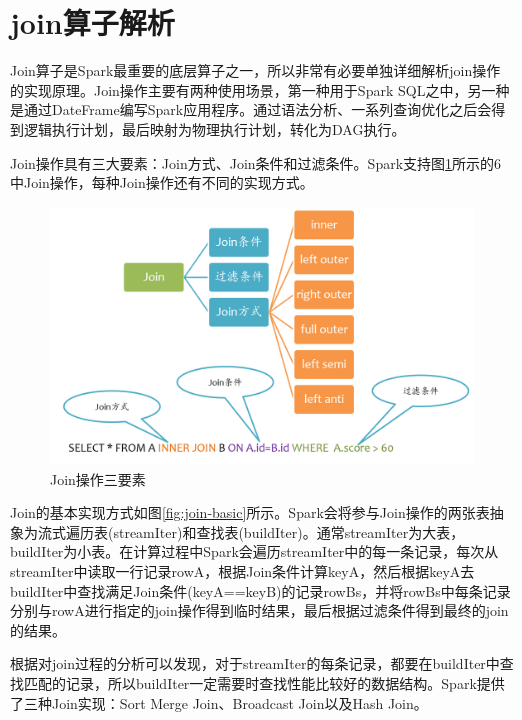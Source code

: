 \section{join算子解析}

Join算子是Spark最重要的底层算子之一，所以非常有必要单独详细解析join操作的实现原理。Join操作主要有两种使用场景，第一种用于Spark SQL之中，另一种是通过DateFrame编写Spark应用程序。通过语法分析、一系列查询优化之后会得到逻辑执行计划，最后映射为物理执行计划，转化为DAG执行。

Join操作具有三大要素：Join方式、Join条件和过滤条件。Spark支持图\ref{fig:join-overview}所示的6中Join操作，每种Join操作还有不同的实现方式。


\begin{figure}
    \centering
    \includegraphics[width=1\textwidth]{Img/spark-sql-join-overview.png}
    \caption{Join操作三要素}
    \label{fig:join-overview}
\end{figure}

Join的基本实现方式如图\ref{fig:join-basic}所示。Spark会将参与Join操作的两张表抽象为流式遍历表(streamIter)和查找表(buildIter)。通常streamIter为大表，buildIter为小表。在计算过程中Spark会遍历streamIter中的每一条记录，每次从streamIter中读取一行记录rowA，根据Join条件计算keyA，然后根据keyA去buildIter中查找满足Join条件(keyA==keyB)的记录rowBs，并将rowBs中每条记录分别与rowA进行指定的join操作得到临时结果，最后根据过滤条件得到最终的join的结果。

根据对join过程的分析可以发现，对于streamIter的每条记录，都要在buildIter中查找匹配的记录，所以buildIter一定需要时查找性能比较好的数据结构。Spark提供了三种Join实现：Sort Merge Join、Broadcast Join以及Hash Join。

